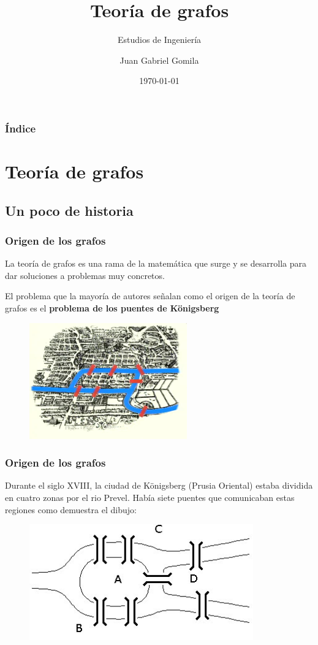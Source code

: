 \documentclass{beamer}
\title[Tema 8 - Introducci\'on a la Teor\'ia de Grafos]{Teor\'ia de grafos}
\subtitle{Estudios de Ingenier\'ia}
\author[https://frogames.es]{
Juan Gabriel Gomila%
}
\institute[Frogames]{
 Frogames
   \and
  \texttt{https://frogames.es}
}
\date{\today}
\begin{document}
 

\frame{\titlepage}

\begin{frame}
  \frametitle{\'Indice}
  \tableofcontents
\end{frame}

\section{Teor\'ia de grafos}
\subsection{Un poco de historia}


\begin{frame}
\frametitle{Origen de los grafos}
La teor\'ia de grafos es una rama de la matem\'atica que surge y se desarrolla para dar soluciones a problemas muy concretos. 

El problema que la mayor\'ia de autores se\~nalan como el origen de la teor\'ia de grafos es el \textbf{problema de los puentes de K\"onigsberg}


\begin{figure}[h]
 \label{fig:volumen}
\centering
\includegraphics[height=5cm]{konisgberg}
\end{figure}
 
\end{frame}

\begin{frame}
\frametitle{Origen de los grafos}
Durante el siglo XVIII, la ciudad de K\"onigsberg (Prusia Oriental) estaba dividida en cuatro zonas por el rio Prevel. Hab\'ia siete puentes que comunicaban estas regiones como demuestra el dibujo:
\begin{figure}[h]
 \label{fig:volumen}
\centering
\includegraphics[height=5cm]{kon2}
\end{figure}
\end{frame}
\end{document}
